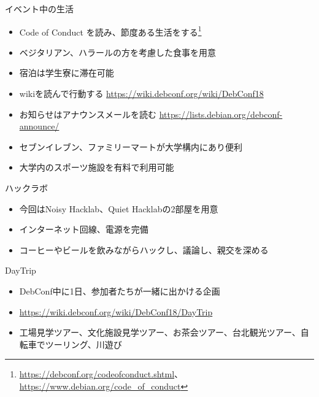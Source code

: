 \documentclass[mingoth,a4paper]{jsarticle}
\begin{document}
イベント中の生活
\begin{itemize}
  \item Code of Conduct を読み、節度ある生活をする\footnote{\url{https://debconf.org/codeofconduct.shtml}、\url{https://www.debian.org/code_of_conduct}}
  \item ベジタリアン、ハラールの方を考慮した食事を用意
  \item 宿泊は学生寮に滞在可能
  \item wikiを読んで行動する \url{https://wiki.debconf.org/wiki/DebConf18}
  \item お知らせはアナウンスメールを読む \url{https://lists.debian.org/debconf-announce/}
  \item セブンイレブン、ファミリーマートが大学構内にあり便利
  \item 大学内のスポーツ施設を有料で利用可能
\end{itemize}


ハックラボ
\begin{itemize}
\item 今回はNoisy Hacklab、Quiet Hacklabの2部屋を用意
\item インターネット回線、電源を完備
\item コーヒーやビールを飲みながらハックし、議論し、親交を深める
\end{itemize}


DayTrip
\begin{itemize}
\item DebConf中に1日、参加者たちが一緒に出かける企画
\item \url{https://wiki.debconf.org/wiki/DebConf18/DayTrip}
\item 工場見学ツアー、文化施設見学ツアー、お茶会ツアー、台北観光ツアー、自転車でツーリング、川遊び
\end{itemize}
\end{document}
